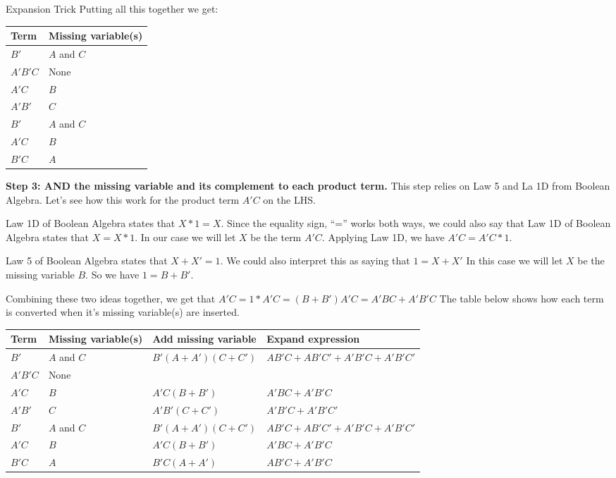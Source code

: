 \begin{process}{Expansion Trick}
Putting all this together we get:

\begin{tabular}[ht]{l|l}
Term		& Missing variable(s)		\\ \hline
$B'$		& $A$ and $C$			\\ \hline
$A'B'C$	& None					\\ \hline
$A'C$		& $B$						\\ \hline

$A'B'$		& $C$						\\ \hline
$B'$		& $A$ and $C$			\\ \hline
$A'C$		& $B$						\\ \hline
$B'C$		& $A$						\\ 
\end{tabular}

\textbf{Step 3: AND the missing variable and its complement to each product term.}
This step relies on Law 5 and La 1D from Boolean Algebra.  Let's see how this work for the 
product term $A'C$ on the LHS.  

Law 1D of Boolean Algebra states that $X*1 = X$. Since the 
equality sign, ``='' works both ways, we could also say that Law 1D of Boolean Algebra states
that $X = X*1$.  In our case we will let $X$ be the term $A'C$.  Applying Law 1D, we have 
$A'C = A'C*1$.

Law 5 of Boolean Algebra states that $X+X' = 1$.  We could also interpret this as saying that 
$1 = X+X'$  In this case we will let $X$ be the missing variable $B$.  So we have
$1 = B+B'$.

Combining these two ideas together, we get that $A'C = 1*A'C = (B+B')A'C = A'BC + A'B'C$
The table below shows how each term is converted when it's missing variable(s) are inserted.

\begin{tabular}[ht]{m{1cm}|m{2cm}|m{3cm}|m{3cm}}
Term		& Missing variable(s)	& Add missing variable	& Expand expression\\ \hline
$B'$		& $A$ and $C$		&	$B'(A + A')(C + C')$		&	$AB'C+AB'C' + A'B'C+A'B'C'$		\\ \hline
$A'B'C$		& None				&								&		\\ \hline
$A'C$		& $B$					&	$A'C(B+B')$				&	$A'BC+A'B'C$	\\ \hline

$A'B'$		& $C$					&	$A'B'(C+C')$ 				&	$A'B'C+A'B'C'$	\\ \hline
$B'$		& $A$ and $C$		&	$B'(A + A')(C + C')$		&	$AB'C+AB'C' + A'B'C+A'B'C'$		\\ \hline
$A'C$		& $B$					&	$A'C(B+B')$				&	$A'BC+A'B'C$	\\ \hline
$B'C$		& $A$					&	$B'C(A+A')$				&	$AB'C+A'B'C$	\\ 
\end{tabular}


\end{process}
